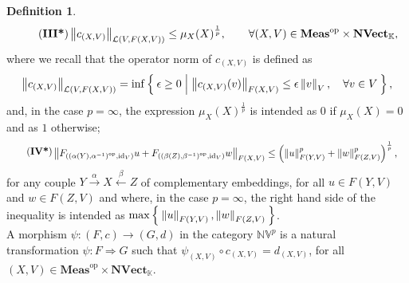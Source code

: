 \documentclass{amsart}
\theoremstyle{definition}
\newtheorem{definition}{Definition}[section]
\theoremstyle{plain}
\newcommand{\norm}[1]{\left\lVert #1\right\rVert} %
\newcommand{\id}{\operatorname{id}}
\newcommand{\opMeas}{\mathbf{Meas}^\mathrm{op}}
\newcommand{\NVect}{\mathbf{NVect}_{\mathbb{K}}}
\newcommand{\NVp}{\mathbb{NV}^p}
\begin{document}
\begin{definition}
\begin{equation}
            \tag{\textbf{III*}}
            \label{ax:boundedness of c 1}
                \norm{c_{(X,V)}}_{\mathcal{L}(V,F(X,V))} \leq \mu_X(X)^{\frac{1}{p}}, \qquad \forall (X,V) \in \opMeas \times \NVect, 
            \end{equation}
            where we recall that the operator norm of $c_{(X,V)}$ is defined as
            \begin{equation*}
                \norm{c_{(X,V)}}_{\mathcal{L}(V,F(X,V))} = \inf \Set{\epsilon \geq 0 | \norm{c_{(X,V)}(v)}_{F(X,V)} \leq \epsilon \norm{v}_V, \quad \forall v \in V},
            \end{equation*}
            and, in the case $p = \infty$, the expression $\mu_X(X)^{\frac{1}{p}}$ is intended as $0$ if $\mu_X(X) = 0$ and as $1$ otherwise;
            \begin{equation}
            \tag{\textbf{IV*}}
            \label{ax:norm inequality wrt complementary embeddings 1}
                \begin{split}
                    &\norm{F_{\left( \left( \alpha(Y),\alpha^{-1} \right)^{\mathrm{op}},\id_V \right)}u + F_{\left( \left( \beta(Z),\beta^{-1} \right)^{\mathrm{op}},\id_V \right)}w}_{F(X,V)} \leq \left( \norm{u}_{F(Y,V)}^p + \norm{w}_{F(Z,V)}^p \right)^{\frac{1}{p}},
                \end{split}
            \end{equation}
            for any couple $Y \xrightarrow{~\alpha~} X \xleftarrow{~\beta~} Z$ of complementary embeddings, for all $u \in F(Y,V)$ and $w \in F(Z,V)$ and where, in the case $p = \infty$, the right hand side of the inequality is intended as $\max \Set{\norm{u}_{F(Y,V)},\norm{w}_{F(Z,V)}}$. \\
            A morphism $\psi \colon (F,c) \rightarrow (G,d)$ in the category $\NVp$ is a natural transformation $\psi \colon F \Rightarrow G$ such that $\psi_{(X,V)} \circ c_{(X,V)} = d_{(X,V)}$, for all $(X,V) \in \opMeas \times \NVect$.
        \end{definition}
\end{document}
